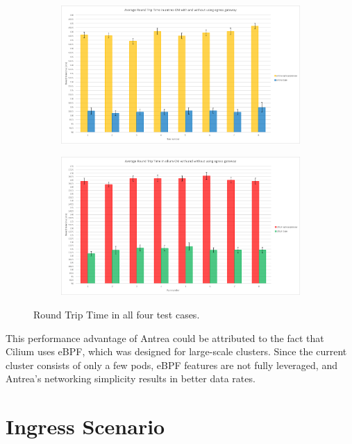 \begin{figure}[H]
    \begin{subfigure}[b]{0.45\textwidth}
        \includegraphics[width=\textwidth]{plots/egress/rtt_antrea.png}
        \caption{}
        \label{fig:rtt_c}
    \end{subfigure}
    \hfill
    \begin{subfigure}[b]{0.45\textwidth}
        \includegraphics[width=\textwidth]{plots/egress/rtt_cilium.png}
        \caption{}
        \label{fig:rtt_d}
    \end{subfigure}
    
    \caption{Round Trip Time in all four test cases.}
    \label{fig:rttFour}
\end{figure}

This performance advantage of Antrea could be attributed to the fact that Cilium uses eBPF, which was designed for large-scale clusters. Since the current cluster consists of only a few pods, eBPF features are not fully leveraged, and Antrea's networking simplicity results in better data rates.

\section{Ingress Scenario}
\label{sec:ingressComparison}

